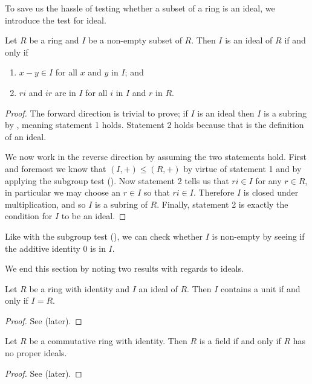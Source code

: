 To save us the hassle of testing whether a subset of a ring is an ideal, we introduce the test for ideal.
\begin{theorem}\label{thrm-test-for-ideal}
    Let $R$ be a ring and $I$ be a non-empty subset of $R$. Then $I$ is an ideal of $R$ if and only if
    \begin{enumerate}
        \item $x - y \in I$ for all $x$ and $y$ in $I$; and
        \item $ri$ and $ir$ are in $I$ for all $i$ in $I$ and $r$ in $R$.
    \end{enumerate}
\end{theorem}
\begin{proof}
    The forward direction is trivial to prove; if $I$ is an ideal then $I$ is a subring by , meaning statement 1 holds. Statement 2 holds because that is the definition of an ideal.

    We now work in the reverse direction by assuming the two statements hold. First and foremost we know that $(I,+) \leq (R,+)$ by virtue of statement 1 and by applying the subgroup test (). Now statement 2 tells us that $ri \in I$ for any $r \in R$, in particular we may choose an $r \in I$ so that $ri \in I$. Therefore $I$ is closed under multiplication, and so $I$ is a subring of $R$. Finally, statement 2 is exactly the condition for $I$ to be an ideal.
\end{proof}
\begin{remark}
    Like with the subgroup test (), we can check whether $I$ is non-empty by seeing if the additive identity 0 is in $I$.
\end{remark}

We end this section by noting two results with regards to ideals.
\begin{proposition}\label{prop-ideal-contains-unit-iff-ideal-is-whole-ring}
    Let $R$ be a ring with identity and $I$ an ideal of $R$. Then $I$ contains a unit if and only if $I = R$.
\end{proposition}
\begin{proof}
    See  (later).
\end{proof}

\begin{proposition}\label{prop-ring-is-field-iff-no-proper-ideals}
    Let $R$ be a commutative ring with identity. Then $R$ is a field if and only if $R$ has no proper ideals.
\end{proposition}
\begin{proof}
    See  (later).
\end{proof}

